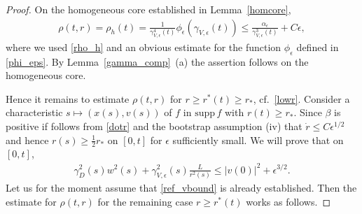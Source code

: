 \documentclass[10pt,a4paper]{amsart}
\def\supp{\mathrm{supp}\,}
\begin{document}
\begin{proof}
  On the homogeneous core established in Lemma~\ref{homcore},
  \begin{align}\label{rho_h_est}
  \rho(t,r) =
  \rho_h(t) = \frac{1}{\gamma^4_{V,\epsilon}(t)}\phi_\epsilon(\gamma_{V,\epsilon}(t))
  \leq
  \frac{\alpha_\epsilon}{\gamma^3_{V,\epsilon}(t)} + C \epsilon,
  \end{align}
  where we used \eqref{rho_h} and an obvious estimate for the function
  $\phi_\epsilon$ defined in \eqref{phi_eps}.
  By Lemma~\ref{gamma_comp}~(a) the assertion follows on the homogeneous core.
  
  Hence it remains to estimate $\rho(t,r)$ for $r\geq r^\ast(t) \geq r_\ast$,
  cf.~\eqref{lowr}. Consider a characteristic $s\mapsto (x(s),v(s))$ of $f$
  in $\supp f$ with $r(t)\geq r_\ast$. Since $\beta$ is positive if follows
  from \eqref{dotr} and the bootstrap assumption (iv) that
  $\dot r \leq C \epsilon^{1/2}$ and hence $r(s)\geq \frac{1}{2}r_\ast$ on
  $[0,t]$ for $\epsilon$ sufficiently small. We will prove that on  $[0,t]$,
  \begin{align}\label{ref_vbound}
    \gamma_D^2(s) w^2(s) + \gamma^2_{V,\epsilon}(s) \frac{L}{r^2(s)}
    \leq |v(0)|^2 + \epsilon^{3/2}.
  \end{align}
  Let us for the moment assume that \eqref{ref_vbound} is already established.
  Then the estimate for $\rho(t,r)$ for the remaining case $r\geq r^\ast(t)$
  works as follows.
  

\end{proof}
\end{document}

